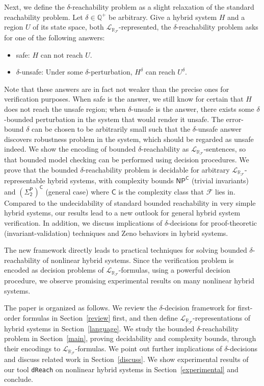 \documentclass[envcountsect]{llncs}
\newcommand{\lrf}{\mathcal{L}_{\mathbb{R}_{\mathcal{F}}}}
\begin{document}
Next, we define the $\delta$-reachability problem as a slight
relaxation of the standard reachability problem. Let $\delta\in \mathbb{Q}^+$ be
arbitrary. Give a hybrid system $H$ and a region $U$ of its state
space, both $\lrf$-represented, the $\delta$-reachability problem asks for
one of the following answers:
\begin{itemize}
 \item {\sf safe}: $H$ can not reach $U$.
 \item {\sf $\delta$-unsafe}: Under some $\delta$-perturbation, $H^{\delta}$ can
reach $U^{\delta}$. 
\end{itemize}
Note that these answers are in fact not weaker than the precise ones for
verification purposes. When {\sf safe} is the answer, we still know for certain
that $H$ does not reach the unsafe region; when {\sf $\delta$-unsafe} is the
answer, there exists some $\delta$-bounded perturbation in the
system that would render it unsafe. The error-bound $\delta$ can be chosen
to be arbitrarily small such that the $\delta$-unsafe answer discovers
robustness problem in the system, which should be regarded as unsafe indeed. We
show the encoding of bounded $\delta$-reachability as $\lrf$-sentences, so that
bounded model checking can be performed using decision procedures. We prove that
the bounded $\delta$-reachability problem is decidable for arbitrary
$\lrf$-representable hybrid systems, with complexity bounds $\mathsf{NP^C}$
(trivial invariants) and $\mathsf{(\Sigma_2^P)^C}$ (general case) where
$\mathsf{C}$ is the complexity class that $\mathcal{F}$ lies in. Compared to the
 undecidability of standard bounded reachability in very simple hybrid systems,
our
results lead to a new outlook for general hybrid system
verification. In addition, we discuss implications of $\delta$-decisions
for proof-theoretic (invariant-validation) techniques and Zeno
behaviors in hybrid systems.  

The new framework directly leads to practical techniques for
solving bounded $\delta$-reachability of nonlinear hybrid systems. Since the
verification problem is encoded as decision problems of $\lrf$-formulas, using a
powerful decision procedure, we observe promising experimental results on many
nonlinear hybrid systems. 

The paper is organized as follows. We review the $\delta$-decision framework
for first-order formulas in Section~\ref{review} first, and then define
$\lrf$-representations of hybrid systems in Section~\ref{language}. We study
the bounded $\delta$-reachability problem in Section~\ref{main}, proving
decidability and complexity bounds, through their encodings to $\lrf$-formulas.
We point out further implications of $\delta$-decisions and discuss related work
in Section~\ref{discuss}. We show experimental results of our tool {\tt dReach}
on nonlinear hybrid systems in Section~\ref{experimental} and conclude. 
\end{document}
